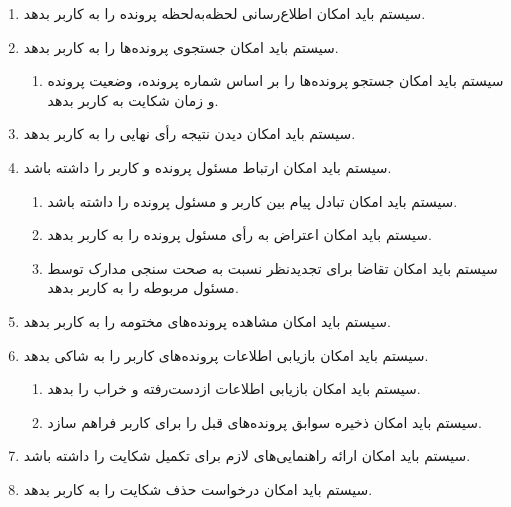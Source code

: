 \documentclass[12pt,a4paper,oneside]{article}
\begin{document}
\begin{itemize}
\begin{enumerate}
			\item 
			سیستم باید امکان اطلاع‌رسانی لحظه‌به‌لحظه پرونده را به کاربر بدهد.
	
			\item 
			سیستم باید امکان جستجوی پرونده‌ها را به کاربر بدهد.
			\begin{enumerate}
				\renewcommand{\labelenumii}{{\rl{\arabic{enumii}.\arabic{enumi}}}R-}
				\item 
				سیستم باید امکان جستجو پرونده‌ها را بر اساس شماره پرونده، وضعیت پرونده و زمان شکایت به کاربر بدهد.
			\end{enumerate}
	
			\item 
			سیستم باید امکان دیدن نتیجه رأی نهایی را به کاربر بدهد.
	
			\item 
			سیستم باید امکان ارتباط مسئول پرونده و کاربر را داشته باشد.
			\begin{enumerate}
				\renewcommand{\labelenumii}{{\rl{\arabic{enumii}.\arabic{enumi}}}R-}
				\item 
				سیستم باید امکان تبادل پیام بین کاربر و مسئول پرونده را داشته باشد.
				\item 
				سیستم باید امکان اعتراض به رأی مسئول پرونده را به کاربر بدهد.
				\item 
				سیستم باید امکان تقاضا برای تجدیدنظر نسبت به صحت سنجی مدارک توسط مسئول مربوطه را به کاربر بدهد.
			\end{enumerate}
	
			\item 
			سیستم باید امکان مشاهده پرونده‌های مختومه را به کاربر بدهد.
	
			\item 
			سیستم باید امکان بازیابی اطلاعات پرونده‌های کاربر را به شاکی بدهد.
			\begin{enumerate}
				\renewcommand{\labelenumii}{{\rl{\arabic{enumii}.\arabic{enumi}}}R-}
				\item 
				سیستم باید امکان بازیابی اطلاعات ازدست‌رفته و خراب را بدهد.
				\item 
				سیستم باید امکان ذخیره سوابق پرونده‌های قبل را برای کاربر فراهم سازد.
			\end{enumerate}
	
			\item 
			سیستم باید امکان ارائه راهنمایی‌های لازم برای تکمیل شکایت را داشته باشد.
	
			\item 
			سیستم باید امکان درخواست حذف شکایت را به کاربر بدهد.
		\end{enumerate}
	

\end{itemize}
\end{document}

